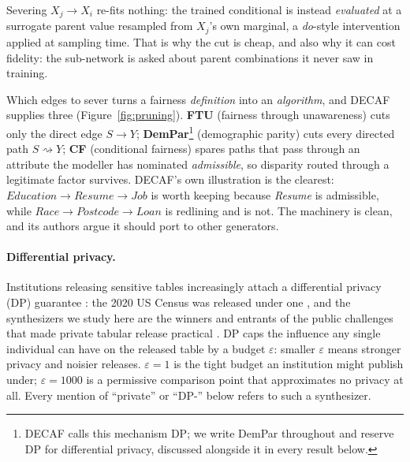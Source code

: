 \documentclass{article}
\begin{document}
Severing $X_j \rightarrow X_i$ re-fits nothing: the trained conditional is
instead \emph{evaluated} at a surrogate parent value resampled from $X_j$'s
own marginal, a \emph{do}-style intervention applied at sampling time. That is
why the cut is cheap, and also why it can cost fidelity: the sub-network is
asked about parent combinations it never saw in training.

Which edges to sever turns a fairness \emph{definition} into an
\emph{algorithm}, and DECAF supplies three (Figure~\ref{fig:pruning}).
\textbf{FTU} (fairness through unawareness) cuts only the direct edge $S
\rightarrow Y$; \textbf{DemPar}\footnote{DECAF calls this mechanism DP; we
write DemPar throughout and reserve DP for differential privacy, discussed
alongside it in every result below.} (demographic parity) cuts every directed
path $S \rightsquigarrow Y$; \textbf{CF} (conditional fairness) spares paths
that pass through an attribute the modeller has nominated \emph{admissible},
so disparity routed through a legitimate factor survives. DECAF's own
illustration is the clearest: $\textit{Education} \rightarrow \textit{Resume}
\rightarrow \textit{Job}$ is worth keeping because \textit{Resume} is
admissible, while $\textit{Race} \rightarrow \textit{Postcode} \rightarrow
\textit{Loan}$ is redlining and is not. The machinery is clean, and its
authors argue it should port to other generators.

\paragraph{Differential privacy.}
Institutions releasing sensitive tables increasingly attach a differential
privacy (DP) guarantee \citep{dwork2006calibrating}: the 2020 US Census was
released under one \citep{abowd2022topdown}, and the synthesizers we study
here are the winners and entrants of the public challenges that made private
tabular release practical \citep{nist2018challenge,mckenna2021mst,vos2024}.
DP caps the influence any single individual can have on the released table by
a budget $\varepsilon$: smaller $\varepsilon$ means stronger privacy and
noisier releases. $\varepsilon{=}1$ is the tight budget an institution might
publish under; $\varepsilon{=}1000$ is a permissive comparison point that
approximates no privacy at all. Every mention of ``private'' or ``DP-''
below refers to such a synthesizer.
\end{document}
